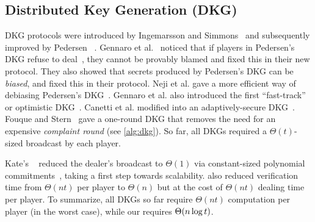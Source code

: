 \subsection{Distributed Key Generation (DKG)}
\label{s:related-work:dkg}
DKG protocols were introduced by Ingemarsson and Simmons~\cite{Ingemarsson1991} and subsequently improved by Pedersen ~\cite{Pedersen1991AThreshold,Pedersen1991NonInteractive}.
Gennaro et al.~\cite{GJKR07} noticed that if players in Pedersen's DKG refuse to deal~\cite{Pedersen1991AThreshold}, they cannot be provably blamed and fixed this in their new \jfdkg protocol.
They also showed that secrets produced by Pedersen's DKG can be \textit{biased}, and fixed this in their \newdkg protocol.
Neji et al. gave a more efficient way of debiasing Pedersen's DKG~\cite{NBB16}.
Gennaro et al. also introduced the first ``fast-track'' or optimistic DKG~\cite{GRR98p}.
Canetti et al. modified \newdkg into an adaptively-secure DKG~\cite{CGJ+99}.
Fouque and Stern~\cite{FS01} gave a one-round DKG that removes the need for an expensive \textit{complaint round} (see \cref{alg:dkg}).
So far, all DKGs required a $\Theta(t)$-sized broadcast by each player.

Kate's \ejfdkg~\cite{Kate2010} reduced the dealer's broadcast to $\Theta(1)$ via constant-sized polynomial commitments~\cite{KZG10a}, taking a first step towards scalability.
\ejfdkg also reduced verification time from $\Theta(nt)$ per player to $\Theta(n)$ but at the cost of $\Theta(nt)$ dealing time per player.
To summarize, all DKGs so far require $\Theta(nt)$ computation per player (in the worst case), while our \ourdkg requires $\Theta(n\log{t})$.

